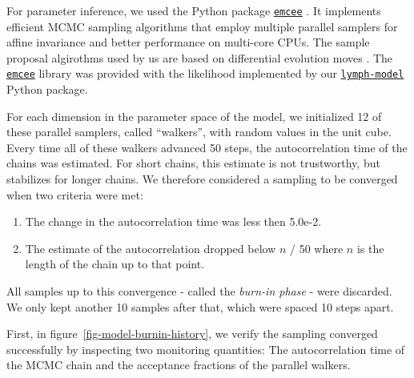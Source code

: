 \documentclass[
  sn-mathphys-num,
]{sn-jnl}
\providecommand{\tightlist}{%
  \setlength{\itemsep}{0pt}\setlength{\parskip}{0pt}}\usepackage{longtable,booktabs,array}
\begin{document}
For parameter inference, we used the Python package
\href{https://emcee.readthedocs.io/en/stable/}{\texttt{emcee}}
\citep{foreman-mackey_emcee_2013}. It implements efficient MCMC sampling
algorithms that employ multiple parallel samplers for affine invariance
and better performance on multi-core CPUs. The sample proposal
algirothms used by us are based on differential evolution moves
\citep{ter_braak_differential_2008, nelson_run_2013}. The
\href{https://emcee.readthedocs.io/en/stable/}{\texttt{emcee}} library
was provided with the likelihood implemented by our
\href{https://lymph-model.readthedocs.io/en/stable/}{\texttt{lymph-model}}
Python package.

For each dimension in the parameter space of the model, we initialized
12 of these parallel samplers, called ``walkers'', with random values in
the unit cube. Every time all of these walkers advanced 50 steps, the
autocorrelation time of the chains was estimated. For short chains, this
estimate is not trustworthy, but stabilizes for longer chains. We
therefore considered a sampling to be converged when two criteria were
met:

\begin{enumerate}
\def\labelenumi{\arabic{enumi}.}
\tightlist
\item
  The change in the autocorrelation time was less then 5.0e-2.
\item
  The estimate of the autocorrelation dropped below \(n\) / 50 where
  \(n\) is the length of the chain up to that point.
\end{enumerate}

All samples up to this convergence - called the \emph{burn-in phase} -
were discarded. We only kept another 10 samples after that, which were
spaced 10 steps apart.

First, in figure~\ref{fig-model-burnin-history}, we verify the sampling
converged successfully by inspecting two monitoring quantities: The
autocorrelation time of the MCMC chain and the acceptance fractions of
the parallel walkers.
\end{document}
